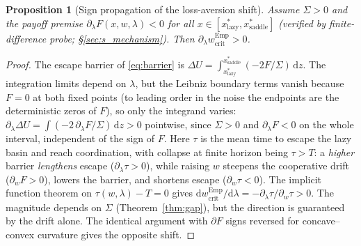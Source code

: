 \documentclass[letterpaper]{article} %
\theoremstyle{plain}
\newtheorem{proposition}{Proposition}
\newcommand{\wcrit}{w_{\mathrm{crit}}}
\begin{document}
\begin{proposition}[Sign propagation of the loss-aversion shift]\label{thm:sign}
Assume $\Sigma>0$ and the payoff premise $\partial_\lambda F(x,w,\lambda)<0$ for all
$x\in[x^\ast_{\mathrm{lazy}},x^\ast_{\mathrm{saddle}}]$ (verified by finite-difference probe;
\S\ref{sec:s_mechanism}). Then $\partial_\lambda \wcrit^{\mathrm{Emp}}>0$.
\end{proposition}
\begin{proof}
The escape barrier of \eqref{eq:barrier} is $\Delta U=\int_{x^\ast_{\mathrm{lazy}}}^{x^\ast_{\mathrm{saddle}}}(-2F/\Sigma)\,\mathrm{d}z$. The
integration limits depend on $\lambda$, but the Leibniz boundary terms vanish because $F=0$ at both
fixed points (to leading order in the noise the endpoints are the deterministic zeros of
$F$), so only the integrand varies:
$\partial_\lambda\Delta U=\int(-2\,\partial_\lambda F/\Sigma)\,\mathrm{d}z>0$ pointwise, since
$\Sigma>0$ and $\partial_\lambda F<0$ on the whole interval, independent of the sign of $F$.
Here $\tau$ is the mean time to escape the lazy basin and reach coordination, with collapse at
finite horizon being $\tau>T$: a \emph{higher} barrier \emph{lengthens} escape
($\partial_\lambda\tau>0$), while raising $w$ steepens the cooperative drift ($\partial_w F>0$),
lowers the barrier, and shortens escape ($\partial_w\tau<0$).
The implicit function theorem on $\tau(w,\lambda)-T=0$ gives
$\mathrm{d}\wcrit^{\mathrm{Emp}}/\mathrm{d}\lambda=-\partial_\lambda\tau/\partial_w\tau>0$.
The magnitude depends on $\Sigma$ (Theorem~\ref{thm:gap}), but the direction is guaranteed by the
drift alone. The identical argument with $\partial F$ signs reversed for concave--convex
curvature gives the opposite shift.
\end{proof}
\end{document}
